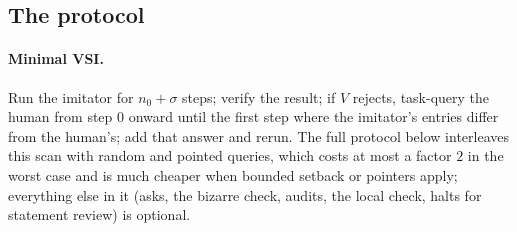 \documentclass[11pt]{article}
\theoremstyle{definition}
\theoremstyle{remark}
\begin{document}
\begin{itemize}
\end{itemize}

\subsection{The protocol}

\paragraph{Minimal VSI.} Run the imitator for $n_0+\sigma$ steps; verify the result; if $V$ rejects, task-query the human from step $0$ onward until the first step where the imitator's entries differ from the human's; add that answer and rerun. The full protocol below interleaves this scan with random and pointed queries, which costs at most a factor $2$ in the worst case and is much cheaper when bounded setback or pointers apply; everything else in it (asks, the bizarre check, audits, the local check, halts for statement review) is optional.
\end{document}
